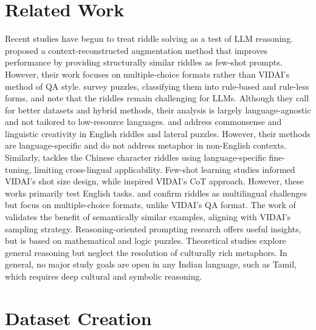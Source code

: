 \documentclass[11pt]{article}
\begin{document}
\section{Related Work} 
Recent studies have begun to treat riddle solving as a test of LLM reasoning. \cite{panagiotopoulos-etal-2025-riscore} proposed a context-reconstructed augmentation method that improves performance by providing structurally similar riddles as few-shot prompts. However, their work focuses on multiple-choice formats rather than VIDAI's method of QA style. \cite{giadikiaroglou-etal-2024-puzzle} survey puzzles, classifying them into rule-based and rule-less forms, and note that the riddles remain challenging for LLMs. Although they call for better datasets and hybrid methods, their analysis is largely language-agnostic and not tailored to low-resource languages.
\cite{lin-etal-2021-riddlesense} and \cite{jiang-etal-2023-brainteaser} address commonsense and linguistic creativity in English riddles and lateral puzzles. However, their methods are language-specific and do not address metaphor in non-English contexts. Similarly, \cite{tan-etal-2016-solving} tackles the Chinese character riddles using language-specific fine-tuning, limiting cross-lingual applicability. Few-shot learning studies \cite{brown2020languagemodelsfewshotlearners, agarwal2025manyshotincontextlearning} informed VIDAI's shot size design, while \cite{wei2022cotpromptingelicitsreasoninginllms} inspired VIDAI's CoT approach. However, these works primarily test English tasks. \cite{zhang2022birdqabilingualdatasetquestion} and \cite{xu2023ccriddlequestionansweringdataset} confirm riddles as multilingual challenges but focus on multiple-choice formats, unlike VIDAI's QA format.
The work of \cite{liu-etal-2022-makes} validates the benefit of semantically similar examples, aligning with VIDAI's sampling strategy. Reasoning-oriented prompting research \cite{kojima2022largelanguagemodelsarezeroshotreasoners, fu2023complexitybasedpromptingmultistepreasoning} offers useful insights, but is based on mathematical and logic puzzles. Theoretical studies \cite{jerome2024inductivereasoninginhumansandllms, wei2022emergentabilitieslargelanguage} explore general reasoning but neglect the resolution of culturally rich metaphors. In general, no major study goals are open in any Indian language, such as Tamil, which requires deep cultural and symbolic reasoning.

\section{Dataset Creation}
\end{document}
